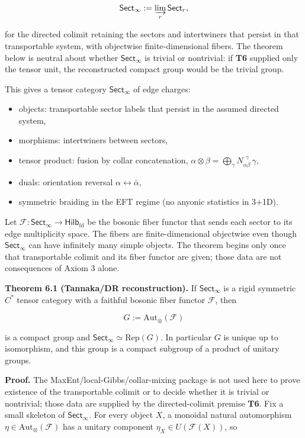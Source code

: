 \[
\mathsf{Sect}_\infty := \varinjlim_r \mathsf{Sect}_r,
\]

for the directed colimit retaining the sectors and intertwiners that persist in that transportable system, with objectwise finite-dimensional fibers. The theorem below is neutral about whether \(\mathsf{Sect}_\infty\) is trivial or nontrivial: if \textbf{T6} supplied only the tensor unit, the reconstructed compact group would be the trivial group.

This gives a tensor category \(\mathsf{Sect}_\infty\) of edge charges:

\begin{itemize}
\tightlist
\item
  objects: transportable sector labels that persist in the assumed directed system,
\item
  morphisms: intertwiners between sectors,
\item
  tensor product: fusion by collar concatenation, \(\alpha \otimes \beta = \bigoplus_\gamma N_{\alpha\beta}^{\ \ \gamma}\,\gamma\),
\item
  duals: orientation reversal \(\alpha \leftrightarrow \bar\alpha\),
\item
  symmetric braiding in the EFT regime (no anyonic statistics in 3+1D).
\end{itemize}

Let \(\mathcal F: \mathsf{Sect}_\infty \to \mathsf{Hilb}_{\mathrm{fd}}\) be the bosonic fiber functor that sends each sector to its edge multiplicity space. The fibers are finite-dimensional objectwise even though \(\mathsf{Sect}_\infty\) can have infinitely many simple objects. The theorem begins only once that transportable colimit and its fiber functor are given; those data are not consequences of Axiom 3 alone.

\textbf{Theorem 6.1 (Tannaka/DR reconstruction).} If \(\mathsf{Sect}_\infty\) is a rigid symmetric \(C^*\) tensor category with a faithful bosonic fiber functor \(\mathcal F\), then

\[
G := \mathrm{Aut}_\otimes(\mathcal F)
\]

is a compact group and \(\mathsf{Sect}_\infty \simeq \mathrm{Rep}(G)\). In particular \(G\) is unique up to isomorphism, and this group is a compact subgroup of a product of unitary groups.

\textbf{Proof.} The MaxEnt/local-Gibbs/collar-mixing package is not used here to prove existence of the transportable colimit or to decide whether it is trivial or nontrivial; those data are supplied by the directed-colimit premise \textbf{T6}. Fix a small skeleton of \(\mathsf{Sect}_\infty\). For every object \(X\), a monoidal natural automorphism \(\eta \in \mathrm{Aut}_\otimes(\mathcal F)\) has a unitary component \(\eta_X \in U(\mathcal F(X))\), so

